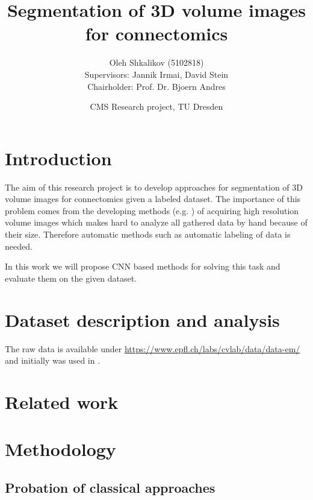 \documentclass[twocolumn, a4paper]{article}
\theoremstyle{definition}
\begin{document}
\title{\bf\Large Segmentation of 3D volume images for connectomics}
\author{Oleh Shkalikov\texorpdfstring{ (5102818)
\\[0.7em]{\small Supervisors: Jannik Irmai, David Stein}
\\{\small Chairholder: Prof. Dr. Bjoern Andres}}{}}
\date{CMS Research project, TU Dresden}

\twocolumn[
    \begin{@twocolumnfalse}
        \maketitle

        \vspace{7ex}
    \end{@twocolumnfalse}
]

\section{Introduction}
The aim of this research project is to develop approaches
for segmentation of 3D volume images for connectomics given
a labeled dataset. The importance of this problem comes from the
developing methods (e.g. \cite{10.7554/eLife.25916}) of acquiring high resolution volume images
which makes hard to analyze all gathered data by hand because of their size.
Therefore automatic methods such as automatic labeling of data is needed.

In this work we will propose CNN based methods for solving this task and evaluate them
on the given dataset.

\section{Dataset description and analysis}

The raw data is available under
\url{https://www.epfl.ch/labs/cvlab/data/data-em/} and initially was used in
\cite{lucchi2011supervoxel,lucchi2013learning}.

\section{Related work}

\section{Methodology}

\subsection{Probation of classical approaches}
\end{document}
